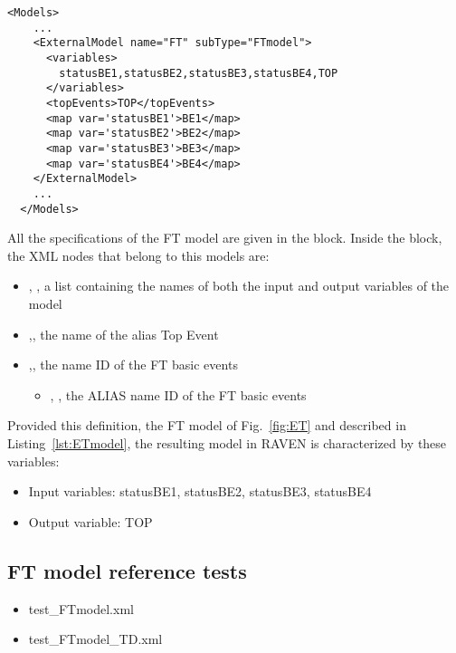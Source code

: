 \begin{lstlisting}[style=XML,morekeywords={anAttribute},caption=FTmodel input example., label=lst:FT_InputExample]
  <Models> 
    ...
    <ExternalModel name="FT" subType="FTmodel">
      <variables>
        statusBE1,statusBE2,statusBE3,statusBE4,TOP
      </variables>
      <topEvents>TOP</topEvents>
      <map var='statusBE1'>BE1</map>
      <map var='statusBE2'>BE2</map>
      <map var='statusBE3'>BE3</map>
      <map var='statusBE4'>BE4</map>
    </ExternalModel>
    ...
  </Models>
\end{lstlisting}

All the specifications of the FT model are given in the 
 block. 
Inside the  block, the XML
nodes that belong to this models are:
\begin{itemize}
  \item  {}, , a list containing the names of both the input and output variables of the model
  \item  {},, the name of the alias Top Event
  \item  {},, the name ID of the FT basic events
	  \begin{itemize}
	    \item {}, , the ALIAS name ID of the FT basic events
	  \end{itemize}
\end{itemize}

Provided this definition, the FT model of Fig.~\ref{fig:ET} and described in Listing~\ref{lst:ETmodel}, 
the resulting model in RAVEN is characterized by these variables:
\begin{itemize}
	\item Input variables: statusBE1, statusBE2, statusBE3, statusBE4
	\item Output variable: TOP
\end{itemize}

\subsection{FT model reference tests}
\begin{itemize}
	\item test\_FTmodel.xml
	\item test\_FTmodel\_TD.xml
\end{itemize}